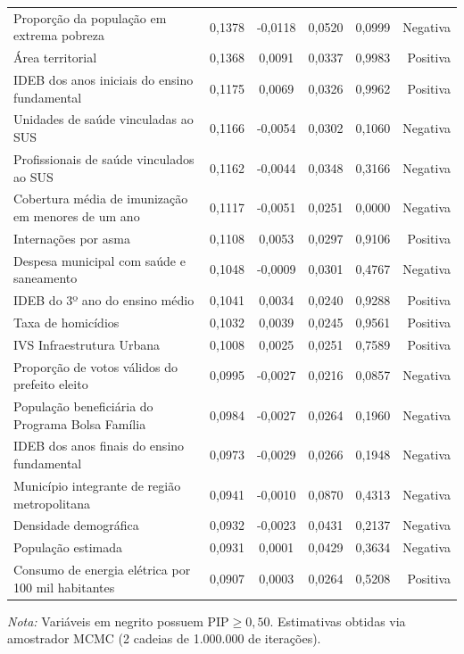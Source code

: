\begin{table}[htbp]
\begin{tabular}{lccccr}
Proporção da população em extrema pobreza & 0,1378 & -0,0118 & 0,0520 & 0,0999 & Negativa \\
Área territorial & 0,1368 & 0,0091 & 0,0337 & 0,9983 & Positiva \\
IDEB dos anos iniciais do ensino fundamental & 0,1175 & 0,0069 & 0,0326 & 0,9962 & Positiva \\
Unidades de saúde vinculadas ao SUS & 0,1166 & -0,0054 & 0,0302 & 0,1060 & Negativa \\
Profissionais de saúde vinculados ao SUS & 0,1162 & -0,0044 & 0,0348 & 0,3166 & Negativa \\
Cobertura média de imunização em menores de um ano & 0,1117 & -0,0051 & 0,0251 & 0,0000 & Negativa \\
Internações por asma & 0,1108 & 0,0053 & 0,0297 & 0,9106 & Positiva \\
Despesa municipal com saúde e saneamento & 0,1048 & -0,0009 & 0,0301 & 0,4767 & Negativa \\
IDEB do 3º ano do ensino médio & 0,1041 & 0,0034 & 0,0240 & 0,9288 & Positiva \\
Taxa de homicídios & 0,1032 & 0,0039 & 0,0245 & 0,9561 & Positiva \\
IVS Infraestrutura Urbana & 0,1008 & 0,0025 & 0,0251 & 0,7589 & Positiva \\
Proporção de votos válidos do prefeito eleito & 0,0995 & -0,0027 & 0,0216 & 0,0857 & Negativa \\
População beneficiária do Programa Bolsa Família & 0,0984 & -0,0027 & 0,0264 & 0,1960 & Negativa \\
IDEB dos anos finais do ensino fundamental & 0,0973 & -0,0029 & 0,0266 & 0,1948 & Negativa \\
Município integrante de região metropolitana & 0,0941 & -0,0010 & 0,0870 & 0,4313 & Negativa \\
Densidade demográfica & 0,0932 & -0,0023 & 0,0431 & 0,2137 & Negativa \\
População estimada & 0,0931 & 0,0001 & 0,0429 & 0,3634 & Negativa \\
Consumo de energia elétrica por 100 mil habitantes & 0,0907 & 0,0003 & 0,0264 & 0,5208 & Positiva \\
\bottomrule
\end{tabular}
\begin{tablenotes}\footnotesize
\item \textit{Nota:} Variáveis em negrito possuem $\text{PIP} \ge 0{,}50$. Estimativas obtidas via amostrador MCMC (2 cadeias de 1.000.000 de iterações).
\end{tablenotes}
\end{table}
